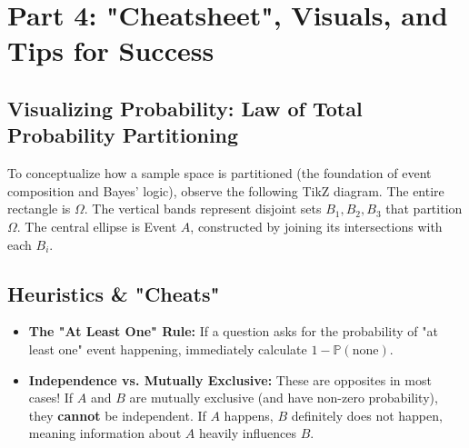 \documentclass[12pt]{article}
\theoremstyle{definition}
\theoremstyle{remark}
\begin{document}
\section{Part 4: "Cheatsheet", Visuals, and Tips for Success}

\subsection{Visualizing Probability: Law of Total Probability Partitioning}
To conceptualize how a sample space is partitioned (the foundation of event composition and Bayes' logic), observe the following TikZ diagram. The entire rectangle is $\Omega$. The vertical bands represent disjoint sets $B_1, B_2, B_3$ that partition $\Omega$. The central ellipse is Event $A$, constructed by joining its intersections with each $B_i$.

\begin{center}
\end{center}

\subsection{Heuristics \& "Cheats"}
\begin{itemize}
    \item \textbf{The "At Least One" Rule:} If a question asks for the probability of "at least one" event happening, immediately calculate $1 - \mathbb{P}(\text{none})$.
    \item \textbf{Independence vs. Mutually Exclusive:} These are opposites in most cases! If $A$ and $B$ are mutually exclusive (and have non-zero probability), they \textbf{cannot} be independent. If $A$ happens, $B$ definitely does not happen, meaning information about $A$ heavily influences $B$.
\end{itemize}
\end{document}
